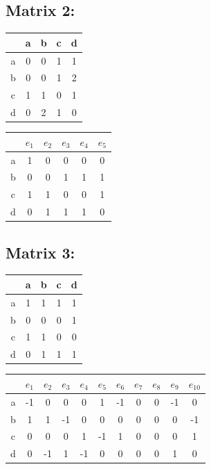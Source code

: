 \documentclass{article}
\begin{document}
\subsection*{Matrix 2:}
\begin{table}[h]
\begin{tabular}{c|c c c c}

  & a & b & c & d \\ \hline
a & 0 & 0 & 1 & 1 \\
b & 0 & 0 & 1 & 2 \\
c & 1 & 1 & 0 & 1 \\
d & 0 & 2 & 1 & 0 \\
\end{tabular}
\hspace{6em}
\begin{tabular}{c|c c c c c}

  & $e_{1}$ & $e_{2}$ & $e_{3}$ & $e_{4}$ & $e_{5}$ \\ \hline
a & 1 & 0 & 0 & 0 & 0 \\
b & 0 & 0 & 1 & 1 & 1 \\
c & 1 & 1 & 0 & 0 & 1 \\
d & 0 & 1 & 1 & 1 & 0 \\
\end{tabular}
\end{table}

\subsection*{Matrix 3:}
\begin{table}[h]
\begin{tabular}{c|c c c c}

  & a & b & c & d \\ \hline
a & 1 & 1 & 1 & 1 \\
b & 0 & 0 & 0 & 1 \\
c & 1 & 1 & 0 & 0 \\
d & 0 & 1 & 1 & 1 \\
\end{tabular}
\hspace{6em}
\begin{tabular}{c|c c c c c c c c c c}

  & $e_{1}$ & $e_{2}$ & $e_{3}$ & $e_{4}$ & $e_{5}$ & $e_{6}$ & $e_{7}$ & $e_{8}$ & $e_{9}$ & $e_{10}$ \\ \hline
a & -1 & 0 & 0 & 0 & 1 & -1 & 0 & 0 & -1 & 0 \\
b & 1 & 1 & -1 & 0 & 0 & 0 & 0 & 0 & 0 & -1 \\
c & 0 & 0 & 0 & 1 & -1 & 1 & 0 & 0 & 0 & 1 \\
d & 0 & -1 & 1 & -1 & 0 & 0 & 0 & 0 & 1 & 0 \\
\end{tabular}
\end{table}
\end{document}
